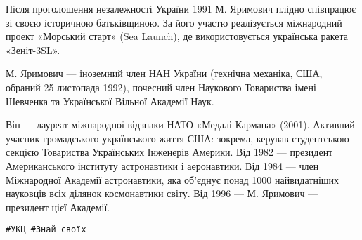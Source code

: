 Після проголошення незалежності України 1991 М. Яримович плідно співпрацює зі
своєю історичною батьківщиною. За його участю реалізується міжнародний проект
«Морський старт» (Sea Launch), де використовується українська ракета
«Зеніт-3SL».

М. Яримович — іноземний член НАН України (технічна механіка, США, обраний 25
листопада 1992), почесний член Наукового Товариства імені Шевченка та
Української Вільної Академії Наук.

Він — лауреат міжнародної відзнаки НАТО «Медалі Кармана» (2001). Активний
учасник громадського українського життя США: зокрема, керував студентською
секцією Товариства Українських Інженерів Америки. Від 1982 — президент
Американського інституту астронавтики і аеронавтики. Від 1984 — член
Міжнародної Академії астронавтики, яка об'єднує понад 1000 найвидатніших
науковців всіх ділянок космонавтики світу. Від 1996 — М. Яримович — президент
цієї Академії.

\verb|#УКЦ #Знай_своїх|
